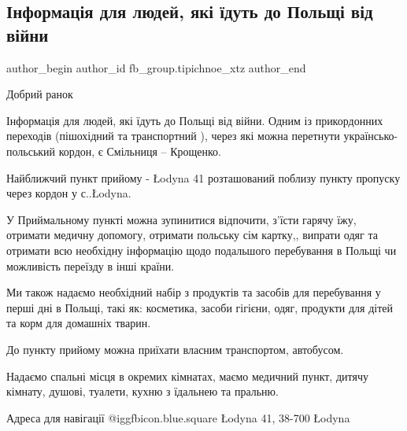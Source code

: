  
 
 
 
 
 
\subsection{Інформація для людей, які їдуть до Польщі від війни}
\label{sec:13_05_2022.fb.fb_group.tipichnoe_xtz.1.info_dlja_ludei_v_polshu}
 
\ifcmt
 author_begin
   author_id fb_group.tipichnoe_xtz
 author_end
\fi

Добрий ранок

Інформація для людей, які їдуть до Польщі від війни.  Одним із прикордонних
переходів (пішохідний та транспортний ), через які можна перетнути
українсько-польський кордон, є Смільниця – Крощенко. 

Найближчий пункт прийому - Łodyna 41 розташований поблизу пункту пропуску через
кордон у с..Łodyna.


У Приймальному пункті можна зупинитися відпочити, з'їсти  гарячу їжу, отримати
медичну допомогу, отримати польську сім картку,, випрати одяг та отримати всю
необхідну інформацію щодо подальшого перебування в Польщі чи можливість
переїзду в інші країни. 

Ми також надаємо необхідний набір з продуктів та засобів для перебування у
перші дні в Польщі, такі як: косметика, засоби гігієни, одяг, продукти для
дітей та корм для домашніх тварин.


До пункту прийому можна приїхати власним транспортом, автобусом.

Надаємо спальні місця в окремих кімнатах, маємо медичний пункт, дитячу кімнату,
душові, туалети, кухню з їдальнею та пральню.

Адреса для навігації  @igg{fbicon.blue.square}  Łodyna 41, 38-700 Łodyna

